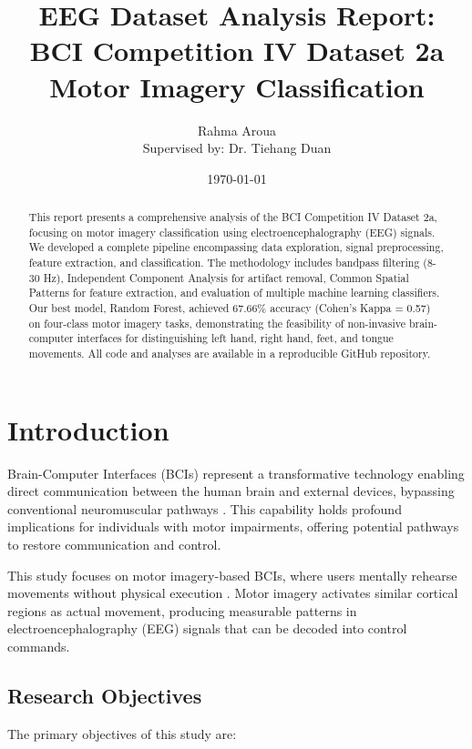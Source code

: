 \documentclass[11pt]{article}
\title{\textbf{EEG Dataset Analysis Report: \\ BCI Competition IV Dataset 2a \\ Motor Imagery Classification}}
\author{Rahma Aroua \\ Supervised by: Dr. Tiehang Duan}
\date{\today}
\begin{document}
\maketitle
\newpage

\begin{abstract}
This report presents a comprehensive analysis of the BCI Competition IV Dataset 2a, focusing on motor imagery classification using electroencephalography (EEG) signals. We developed a complete pipeline encompassing data exploration, signal preprocessing, feature extraction, and classification. The methodology includes bandpass filtering (8-30 Hz), Independent Component Analysis for artifact removal, Common Spatial Patterns for feature extraction, and evaluation of multiple machine learning classifiers. Our best model, Random Forest, achieved 67.66\% accuracy (Cohen's Kappa = 0.57) on four-class motor imagery tasks, demonstrating the feasibility of non-invasive brain-computer interfaces for distinguishing left hand, right hand, feet, and tongue movements. All code and analyses are available in a reproducible GitHub repository.
\end{abstract}

\newpage
\tableofcontents
\newpage

\section{Introduction}

Brain-Computer Interfaces (BCIs) represent a transformative technology enabling direct communication between the human brain and external devices, bypassing conventional neuromuscular pathways \citep{wolpaw2000brain}. This capability holds profound implications for individuals with motor impairments, offering potential pathways to restore communication and control.

This study focuses on motor imagery-based BCIs, where users mentally rehearse movements without physical execution \citep{pfurtscheller1999motor}. Motor imagery activates similar cortical regions as actual movement, producing measurable patterns in electroencephalography (EEG) signals that can be decoded into control commands.

\subsection{Research Objectives}

The primary objectives of this study are:
\end{document}
